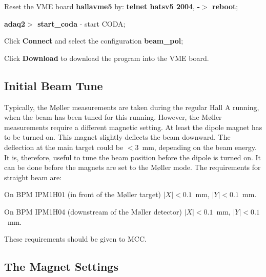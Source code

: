 {\begin{list}{--}{\setlength{\itemsep}{-0.15cm}}
   \item Reset the VME board {\bf hallavme5} by: {\bf telnet hatsv5 2004}, {\bf -$>$ reboot};  
   \item {\bf adaq2$>$ start\_coda} - start CODA;
   \item Click {\bf Connect} and select the configuration {\bf beam\_pol};
   \item Click {\bf Download} to download the program into the VME board.
 \end{list}
\subsection {Initial Beam Tune}
\label{sec:moller_oper_initbeam}
\vspace{-\parskip}

 Typically, the M{\o}ller measurements are taken during the regular Hall A
 running, when the beam has been tuned for this running. However,
 the M{\o}ller measurements require a different magnetic setting.
 At least the dipole magnet has to be turned on. This magnet
 slightly deflects the beam downward. The deflection at the main target
 could be $<3$~mm, depending on the beam energy. It is, therefore, 
 useful to tune the beam position before the dipole is turned on. It can be done
 before the magnets are set to the M{\o}ller mode.
 The requirements for straight beam are: 
\vspace{-\parskip}
 \begin{list}{--}{\setlength{\itemsep}{-0.15cm}}
   \item On BPM IPM1H01 (in front of the M{\o}ller target) $|X|<0.1$~mm, $|Y|<0.1$~mm.
   \item On BPM IPM1H04 (downstream of the M{\o}ller detector)  $|X|<0.1$~mm, $|Y|<0.1$~mm.
 \end{list}
\vspace{-\parskip}
 These requirements should be given to MCC.
\subsection {The Magnet Settings}
\label{sec:moller_oper_magset}
\vspace{-\parskip}

}
